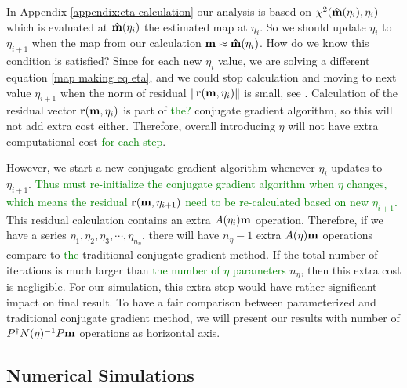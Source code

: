 \documentclass[twocolumn,linenumbers]{aastex631}
\newcommand{\Eq}[1]{\text{Eq.\,\ref{#1}}}
\newcommand{\vbm}{\vb{m}}
\newcommand{\inv}[1]{#1^{-1}}
\newcommand{\hatm}{\vb{\hat{m}}}
\newcommand{\Pdagger}{P^{\dagger}}
\newcommand{\textgreen}[1]{\textcolor{green}{#1}}
\begin{document}
In Appendix \ref{appendix:eta calculation}
our analysis is based on
$\chi^2(\hatm(\eta_i), \eta_i)$ which is evaluated at 
$\hatm(\eta_i)$ the estimated map at $\eta_i$.
So we should update $\eta_i$ to $\eta_{i+1}$ when the map from our calculation
$\vbm \approx \hatm(\eta_i)$. 
How do we know this condition is satisfied?
Since for each new $\eta_i$ value, we are solving a different equation \ref{map making eq eta},
and we could stop calculation and moving to next value $\eta_{i+1}$ when the 
norm of residual $\norm{\vb{r}(\vbm,\eta_i)}$ is small, see \Eq{norm threshold}.
Calculation of the residual vector $\vb{r}(\vbm,\eta_i)$ is part of \textgreen{the?} conjugate gradient algorithm,
so this will not add extra cost either.
Therefore, overall introducing $\eta$ will not have extra computational cost \textgreen{for each step}.

However, we start a new conjugate gradient algorithm whenever $\eta_i$ updates to $\eta_{i+1}$.
\textgreen{
Thus must re-initialize the conjugate gradient algorithm when $\eta$ changes,
which means the residual $\vb{r}(\vbm, \eta_{i+1})$ need to be re-calculated based on new $\eta_{i+1}$.  
}
This residual calculation contains an extra $A(\eta_i) \vbm$ operation.
Therefore, if we have a series $\eta_1, \eta_2, \eta_3, \cdots, \eta_{n_{\eta}}$,
there will have $n_{\eta}-1$ extra $A(\eta) \vbm$ operations compare to \textgreen{the} traditional conjugate gradient
method.
If the total number of iterations is much larger than \textgreen{\sout{the number of $\eta$ parameters}} $n_{\eta}$,
then this extra cost is negligible.
For our simulation, this extra step would have rather significant impact on final result.
To have a fair comparison between parameterized and traditional conjugate gradient method,
we will present our results with number of $\Pdagger \inv{N(\eta)} P\vbm$ operations as horizontal axis.



\subsection{Numerical Simulations}
\end{document}
